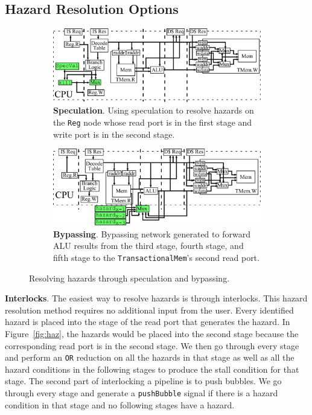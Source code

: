 \subsection{Hazard Resolution Options}
\begin{figure}[htb]
\centering
  \begin{subfigure}[t]{0.8\textwidth}
  \centering
  \includegraphics[width=\textwidth]{figures/pipelinespec.pdf}
  \caption{{\bf Speculation}. Using speculation to resolve hazards on
    the {\tt Reg} node whose read port is in the first stage and write port
  is in the second stage.}
  \label{fig:spec}
  \end{subfigure}
  \begin{subfigure}[t]{0.8\textwidth}
  \vspace{20pt}
  \centering
  \includegraphics[width=\textwidth]{figures/pipelinebypass.pdf}
  \caption{{\bf Bypassing}. Bypassing network generated to forward ALU
  results from the third stage, fourth stage, and fifth stage to the
  {\tt TransactionalMem}'s second read port.}
  \label{fig:bypass}
  \end{subfigure}
\caption{Resolving hazards through speculation and bypassing.}
\label{fig:specbyp}
\end{figure}

{\bf Interlocks}. The easiest way to resolve
hazards is through interlocks. This hazard resolution method requires
no additional input from the user. Every identified hazard is placed
into the stage of the read port that generates the hazard. In
Figure~\ref{fig:haz}, the hazards would be placed into the second
stage because the corresponding read port is in the second stage. We
then go through every stage and perform an {\tt OR} reduction on all
the hazards in that stage as well as all the hazard conditions in the
following stages to produce the stall condition for that stage. The
second part of interlocking a pipeline is to push bubbles. We go
through every stage and generate a {\tt pushBubble} signal if there is
a hazard condition in that stage and no following stages have a
hazard.


